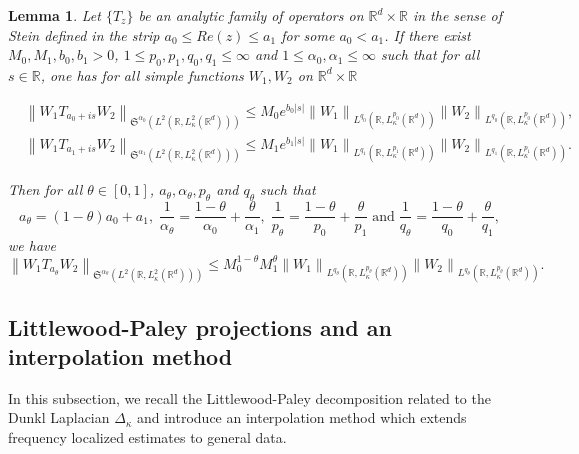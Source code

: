 \documentclass[a4paper,11pt, reqno]{amsart}
\numberwithin{equation}{section}
\theoremstyle{plain}
\newtheorem{lemma}[theorem]{Lemma}
\theoremstyle{definition}
\theoremstyle{remark}
\begin{document}
\begin{lemma}\label{interpolation schatten}
		Let $\{T_z\}$ be an analytic family of operators on $\mathbb{R}^d\times \mathbb{R}$ in the sense of Stein defined in the strip $a_0\leq Re (z) \leq a_1$ for some $a_0<a_1$. If there exist $M_0, M_1, b_0, b_1>0$, $1\leq p_0,p_1,q_0,q_1\leq \infty$ and $1\leq \alpha_0,\alpha_1\leq\infty$ such that for all $s\in\mathbb{R}$, one has for all simple functions $W_1,W_2$ on $\mathbb{R}^d\times \mathbb{R}$
		\begin{small}\begin{equation*}		
				\begin{aligned}
					&
 \left\|W_1T_{a_0+is}W_2\right\|_{\mathfrak{S}^{\alpha_0}\left(L^2(\mathbb{R}, L_\kappa^2(\mathbb{R}^d))\right)}\leq M_0 e^{b_0|s|}\left\|W_1\right\|_{L^{q_0}(\mathcal{\mathbb{R}}, L_\kappa^{p_0}(\mathbb{R}^d))}\left\|W_2\right\|_{L^{q_0}(\mathbb{R}, L_\kappa^{p_0}(\mathbb{R}^d))},\\			
					&	\left\|W_1T_{a_1+is}W_2\right\|_{\mathfrak{S}^{\alpha_1}\left(L^2(\mathbb{R}, L_\kappa^2(\mathbb{R}^d))\right)}\leq M_1e^{b_1|s|}\left\|W_1\right\|_{L^{q_1}(\mathbb{R}, L_\kappa^{p_1}(\mathbb{R}^d))}\left\|W_2\right\|_{L^{q_1}(\mathbb{R}, L_\kappa^{p_1}(\mathbb{R}^d))}.
				\end{aligned}
			\end{equation*}
		\end{small}
		Then for all $\theta\in [0,1]$, $a_\theta, \alpha_\theta, p_\theta$ and $q_\theta$ such that
			\begin{equation*}
				a_\theta=(1-\theta)a_0+a_1,\; \frac{1}{\alpha_\theta}=\frac{1-\theta}{\alpha_0}+\frac{\theta}{\alpha_1},\;\frac{1}{p_\theta}=\frac{1-\theta}{p_0}+\frac{\theta}{p_1}\;\text{and}\;\frac{1}{q_\theta}=\frac{1-\theta}{q_0}+\frac{\theta}{q_1},
			\end{equation*}
            we have
			\begin{equation*}
\left\|W_1T_{a_\theta}W_2\right\|_{\mathfrak{S}^{\alpha_\theta}\left(L^2(\mathbb{R}, L_\kappa^2(\mathbb{R}^d))\right)}\leq  M_0^{1-\theta}M_1^\theta\left\|W_1\right\|_{L^{q_\theta}(\mathbb{R}, L_\kappa^{p_\theta}(\mathbb{R}^d))}\left\|W_2\right\|_{L^{q_\theta}(\mathbb{R}, L_\kappa^{p_\theta}(\mathbb{R}^d))}.
			\end{equation*}
	\end{lemma}
 
\subsection{Littlewood-Paley projections and an interpolation method}\label{L-P section}
In this subsection, we recall the Littlewood-Paley decomposition related to the Dunkl Laplacian $\Delta_\kappa$ and introduce an interpolation method which extends frequency localized estimates to general data.
\end{document}
